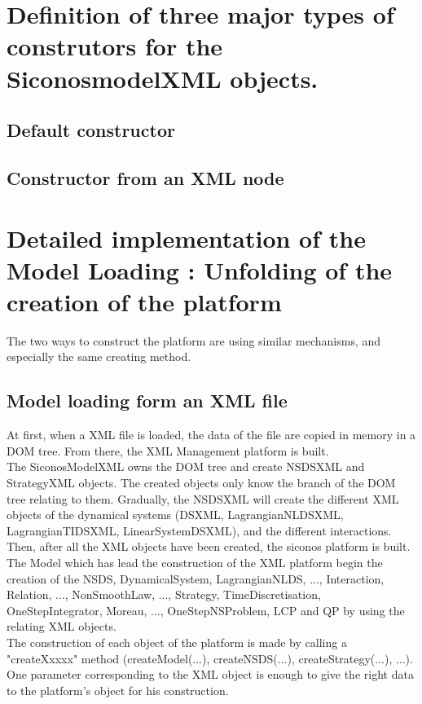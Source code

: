
\section{Definition of three major types of construtors for the SiconosmodelXML objects.}


\subsection{Default constructor}

\subsection{Constructor from an XML node}


\section{Detailed implementation of the Model Loading : Unfolding of the creation of the platform}
The two ways to construct the platform are using similar mechanisms, and especially the same creating
method.



\subsection{Model loading form an XML file}


At first, when a XML file is loaded, the data of the file are copied in memory in a DOM tree. From
there, the XML Management platform is built.\\
The SiconosModelXML owns the DOM tree and create NSDSXML and StrategyXML objects. The created objects
only know the branch of the DOM tree relating to them. Gradually, the NSDSXML will create the
different XML objects of the dynamical systems (DSXML, LagrangianNLDSXML, LagrangianTIDSXML,
LinearSystemDSXML), and the different interactions.\\
Then, after all the XML objects have been created, the \ac{siconos} platform is built.\\
The Model which has lead the construction of the XML platform begin the creation of the NSDS,
DynamicalSystem, LagrangianNLDS, ..., Interaction, Relation, ..., NonSmoothLaw, ..., Strategy,
TimeDiscretisation, OneStepIntegrator, Moreau, ..., OneStepNSProblem, LCP and QP by using the
relating XML objects.\\
The construction of each object of the platform is made by calling a
"createXxxxx" method (createModel(...), createNSDS(...), createStrategy(...), ...). One parameter
corresponding to the XML object is enough to give the right data to the platform's object for his
construction.


